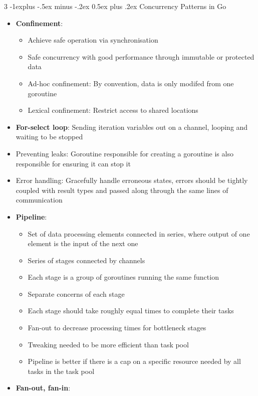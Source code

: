 \documentclass[10pt, landscape]{article}
\makeatletter
\renewcommand{\section}{\@startsection{section}{1}{0mm}%
                                {-1ex plus -.5ex minus -.2ex}%
                                {0.5ex plus .2ex}%
                                {\normalfont\large\bfseries}}
\renewcommand{\section}{\@startsection{section}{2}{0mm}%
                                {-1explus -.5ex minus -.2ex}%
                                {0.5ex plus .2ex}%
                                {\normalfont\normalsize\bfseries}}
\makeatother
\begin{document}
\begin{multicols*}{3}
\section{Concurrency Patterns in Go}
\begin{itemize}
    \item \textbf{Confinement}:
    \begin{itemize}
        \item Achieve safe operation via synchronisation
        \item Safe concurrency with good performance through immutable or protected data
        \item Ad-hoc confinement: By convention, data is only modifed from one goroutine
        \item Lexical confinement: Restrict access to shared locations
    \end{itemize}
    \item \textbf{For-select loop}: Sending iteration variables out on a channel, looping and waiting to be stopped
    \item Preventing leaks: Goroutine responsible for creating a goroutine is also responsible for ensuring it can stop it
    \item Error handling: Gracefully handle erroneous states, errors should be tightly coupled with result types and passed along through the same lines of communication
    \item \textbf{Pipeline}:
    \begin{itemize}
        \item Set of data processing elements connected in series, where output of one element is the input of the next one
        \item Series of stages connected by channels
        \item Each stage is a group of goroutines running the same function
        \item Separate concerns of each stage
        \item Each stage should take roughly equal times to complete their tasks
        \item Fan-out to decrease processing times for bottleneck stages
        \item Tweaking needed to be more efficient than task pool
        \item Pipeline is better if there is a cap on a specific resource needed by all tasks in the task pool
    \end{itemize}
    \item \textbf{Fan-out, fan-in}:

\end{itemize}
\end{multicols*}
\end{document}
